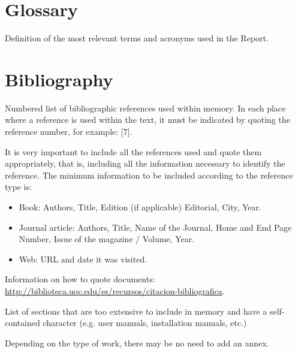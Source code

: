 \documentclass[ENG]{TFUOC}%
\begin{document}


\chapter{Glossary}

Definition of the most relevant terms and acronyms used in the Report.


\chapter{Bibliography}

Numbered list of bibliographic references used within memory. In each place where a reference is used within the text, it must be indicated by quoting the reference number, for example: [7].

It is very important to include all the references used and quote them appropriately, that is, including all the information necessary to identify the reference. The minimum information to be included according to the reference type is:

\begin{itemize}
\item Book: Authors, Title, Edition (if applicable) Editorial, City, Year.
\item  Journal article: Authors, Title, Name of the Journal, Home and End Page Number, Issue of the magazine / Volume, Year.
\item  Web: URL and date it was visited.
\end{itemize}

Information on how to quote documents: \url{http://biblioteca.uoc.edu/es/recursos/citacion-bibliografica}.


\newpage
\appendix
List of sections that are too extensive to include in memory and have a self-contained character (e.g. user manuals, installation manuals, etc.)
 
Depending on the type of work, there may be no need to add an annex.
\end{document}
